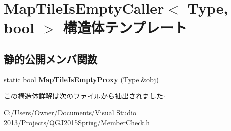 \hypertarget{struct_map_tile_is_empty_caller}{}\section{Map\+Tile\+Is\+Empty\+Caller$<$ Type, bool $>$ 構造体テンプレート}
\label{struct_map_tile_is_empty_caller}
\subsection*{静的公開メンバ関数}
\begin{DoxyCompactItemize}
\item 
static bool {\bfseries Map\+Tile\+Is\+Empty\+Proxy} (Type \&obj)\hypertarget{struct_map_tile_is_empty_caller_a2da9c459b8091e61fe20ab9b382edac5}{}\label{struct_map_tile_is_empty_caller_a2da9c459b8091e61fe20ab9b382edac5}

\end{DoxyCompactItemize}


この構造体詳解は次のファイルから抽出されました\+:\begin{DoxyCompactItemize}
\item 
C\+:/\+Users/\+Owner/\+Documents/\+Visual Studio 2013/\+Projects/\+Q\+G\+J2015\+Spring/\hyperlink{_member_check_8h}{Member\+Check.\+h}\end{DoxyCompactItemize}
